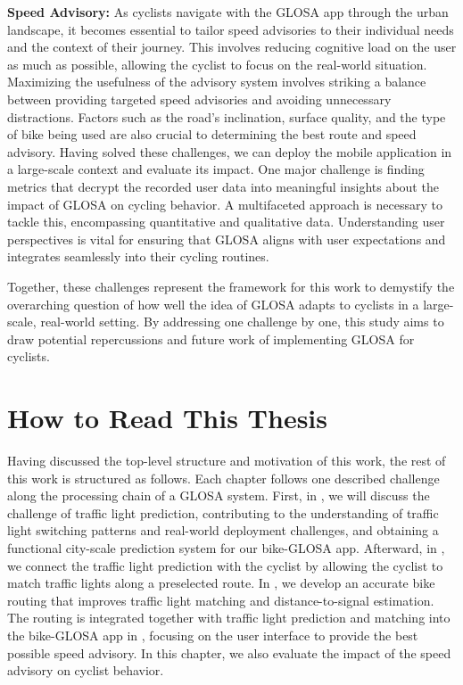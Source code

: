 \textbf{\color{cidarkblue}Speed Advisory:} As cyclists navigate with the GLOSA app through the urban landscape, it becomes essential to tailor speed advisories to their individual needs and the context of their journey. This involves reducing cognitive load on the user as much as possible, allowing the cyclist to focus on the real-world situation. Maximizing the usefulness of the advisory system involves striking a balance between providing targeted speed advisories and avoiding unnecessary distractions. Factors such as the road's inclination, surface quality, and the type of bike being used are also crucial to determining the best route and speed advisory. Having solved these challenges, we can deploy the mobile application in a large-scale context and evaluate its impact. One major challenge is finding metrics that decrypt the recorded user data into meaningful insights about the impact of GLOSA on cycling behavior. A multifaceted approach is necessary to tackle this, encompassing quantitative and qualitative data. Understanding user perspectives is vital for ensuring that GLOSA aligns with user expectations and integrates seamlessly into their cycling routines. 

Together, these challenges represent the framework for this work to demystify the overarching question of how well the idea of GLOSA adapts to cyclists in a large-scale, real-world setting. By addressing one challenge by one, this study aims to draw potential repercussions and future work of implementing GLOSA for cyclists.

\section{How to Read This Thesis}

Having discussed the top-level structure and motivation of this work, the rest of this work is structured as follows. Each chapter follows one described challenge along the processing chain of a GLOSA system. First, in , we will discuss the challenge of traffic light prediction, contributing to the understanding of traffic light switching patterns and real-world deployment challenges, and obtaining a functional city-scale prediction system for our bike-GLOSA app. Afterward, in , we connect the traffic light prediction with the cyclist by allowing the cyclist to match traffic lights along a preselected route. In , we develop an accurate bike routing that improves traffic light matching and distance-to-signal estimation. The routing is integrated together with traffic light prediction and matching into the bike-GLOSA app in , focusing on the user interface to provide the best possible speed advisory. In this chapter, we also evaluate the impact of the speed advisory on cyclist behavior. 

